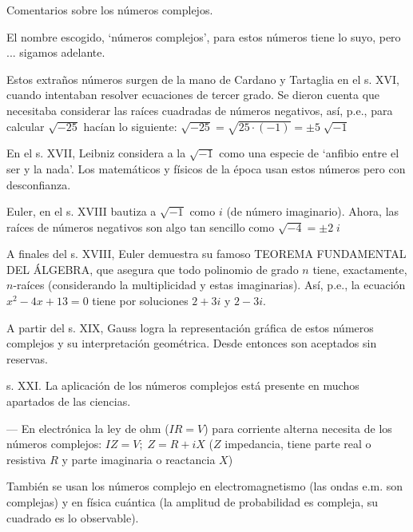 \begin{myexampleblock}{Comentarios sobre los números complejos.}

\small{El nombre escogido, `números complejos',  para estos números tiene lo suyo, pero ... sigamos adelante.}

\vspace{2mm}
\small{Estos extraños números surgen de la mano de Cardano y Tartaglia en el s. XVI, cuando intentaban resolver ecuaciones de tercer grado. Se dieron cuenta que necesitaba considerar las raíces cuadradas de números negativos, así, p.e., para calcular $\sqrt{-25}$ hacían lo siguiente: $\sqrt{-25} = \sqrt{ 25 \cdot (-1)} = \pm 5 \; \sqrt{-1}$}


\vspace{2mm}
\small{En el s. XVII, Leibniz considera a la $\sqrt{-1}$ como una especie de `anfibio entre el ser y la nada'. Los matemáticos y físicos de la época usan estos números pero con desconfianza.}


\vspace{2mm}
\small{Euler, en el s. XVIII bautiza a $\sqrt{-1}$ como $i$ (de número imaginario). Ahora, las raíces de números negativos son algo tan sencillo como $\sqrt{-4}=\pm 2\;i$}


\vspace{2mm}
\small{A finales del s. XVIII, Euler demuestra su famoso TEOREMA FUNDAMENTAL DEL ÁLGEBRA, que asegura que todo polinomio de grado $n$ tiene, exactamente, $n$-raíces (considerando la multiplicidad y estas imaginarias).  Así, p.e., la ecuación                 $x^2-4x+13=0$ tiene por soluciones  $2+3i$  y  $2-3i$.}


\vspace{2mm}
\small{A partir del s. XIX, Gauss logra la representación gráfica de estos números complejos y su interpretación geométrica. Desde entonces son aceptados sin reservas.}


\vspace{2mm}
\small{s. XXI. La aplicación de los números complejos está presente en muchos apartados de las ciencias.}

\vspace{2mm}
\small{--- En electrónica la ley de ohm ($IR=V$) para corriente alterna necesita de los números complejos: $IZ=V; \; Z=R+iX$  ($Z$ impedancia, tiene parte real o resistiva $R$ y parte imaginaria o reactancia $X$)}

\vspace{2mm}
\small{También se usan los números complejo en electromagnetismo (las ondas e.m. son complejas) y en física cuántica (la amplitud de probabilidad es compleja, su cuadrado es lo observable).}



\end{myexampleblock}
